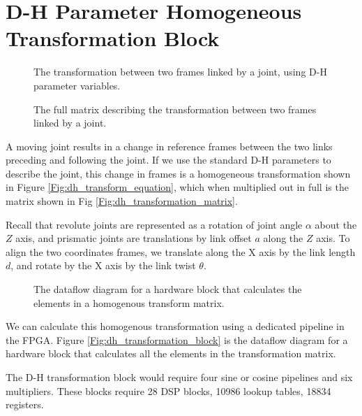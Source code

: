 \section{D-H Parameter Homogeneous Transformation Block}

\begin{figure}[ht]
\center
{}
\caption{The transformation between two frames linked by a joint, using D-H parameter variables.}
\label{fig:dh_transform_equation}
\end{figure}

\begin{figure}[ht]
\center
{}
\caption{The full matrix describing the transformation between two frames linked by a joint.}
\label{fig:dh_transform_matrix}
\end{figure}

A moving joint results in a change in reference frames between the two links preceding and following the joint. If we use the standard D-H parameters to describe the joint, this change in frames is a homogeneous transformation shown in Figure \ref{Fig:dh_transform_equation}, which when multiplied out in full is the matrix shown in Fig \ref{Fig:dh_transformation_matrix}.

Recall that revolute joints are represented as a rotation of joint angle $\alpha$ about the $Z$ axis, and prismatic joints are translations by link offset $a$ along the $Z$ axis. To align the two coordinates frames, we translate along the X axis by the link length $d$, and rotate by the X axis by the link twist $\theta$.

\begin{figure}[ht]
\center
{}
\caption{The dataflow diagram for a hardware block that calculates the elements in a homogenous transform matrix.}
\label{fig:dh_transform_block}
\end{figure}

We can calculate this homogenous transformation using a dedicated pipeline in the FPGA. Figure \ref{Fig:dh_transformation_block} is the dataflow diagram for a hardware block that calculates all the elements in the transformation matrix.

The D-H transformation block would require four sine or cosine pipelines and six multipliers. These blocks require 28 DSP blocks, 10986 lookup tables, 18834 registers.